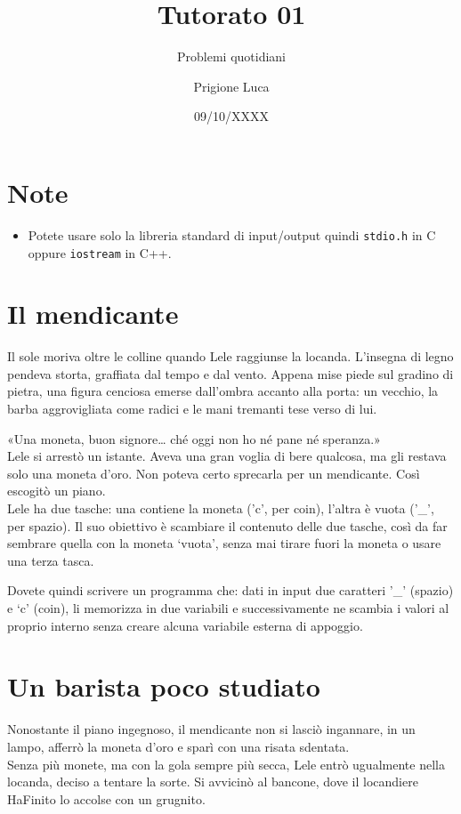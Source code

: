 \documentclass[a4paper]{article}
\title{Tutorato 01}
\subtitle{Problemi quotidiani}
\author{Prigione Luca}
\date{09/10/XXXX}
\begin{document}
\pagestyle{empty}

\maketitle

\section*{Note}
    \begin{itemize}
        \item Potete usare solo la libreria standard di input/output quindi \texttt{stdio.h} in C oppure \texttt{iostream} in C++.
    \end{itemize}

\section*{Il mendicante}
Il sole moriva oltre le colline quando Lele raggiunse la locanda. L'insegna di legno pendeva storta, graffiata dal tempo e dal vento.
Appena mise piede sul gradino di pietra, una figura cenciosa emerse dall'ombra accanto alla porta: un vecchio, la barba aggrovigliata come radici e le mani tremanti tese verso di lui.

«Una moneta, buon signore… ché oggi non ho né pane né speranza.»\\
Lele si arrestò un istante. Aveva una gran voglia di bere qualcosa, ma gli restava solo una moneta d'oro. Non poteva certo sprecarla per un mendicante.
Così escogitò un piano.\\
Lele ha due tasche: una contiene la moneta ('c', per coin), l'altra è vuota ('\_', per spazio). Il suo obiettivo è scambiare il contenuto delle due tasche, così da far sembrare quella con la moneta `vuota', senza mai tirare fuori la moneta o usare una terza tasca.

Dovete quindi scrivere un programma che: dati in input due caratteri '\_' (spazio) e `c' (coin), li memorizza in due variabili e successivamente ne scambia i valori al proprio interno senza creare alcuna variabile esterna di appoggio.

\section*{Un barista poco studiato}
Nonostante il piano ingegnoso, il mendicante non si lasciò ingannare, in un lampo, afferrò la moneta d'oro e sparì con una risata sdentata.\\
Senza più monete, ma con la gola sempre più secca, Lele entrò ugualmente nella locanda, deciso a tentare la sorte.
Si avvicinò al bancone, dove il locandiere HaFinito lo accolse con un grugnito.
\end{document}
